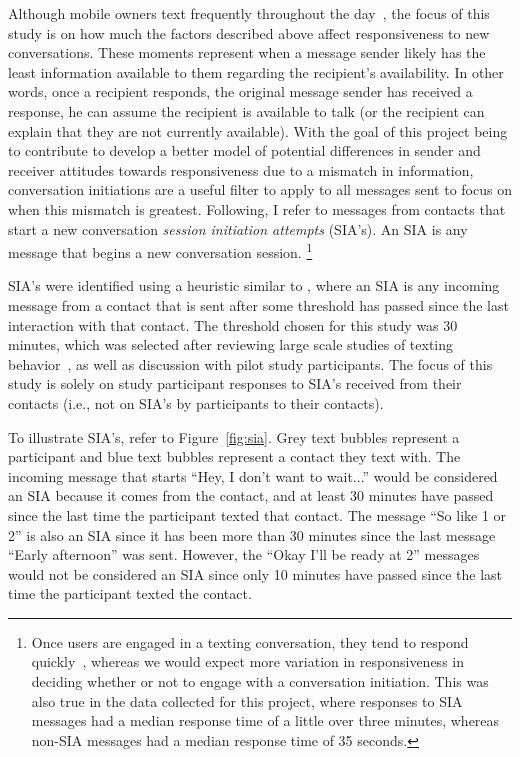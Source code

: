 \documentclass[12pt]{nuthesis}	%
\begin{document}
Although mobile owners text frequently throughout the day~\citep{battestini2010large}, the focus of this study is on how much the factors described above affect responsiveness to new conversations. These moments represent when a message sender likely has the least information available to them regarding the recipient's availability. In other words, once a recipient responds, the original message sender has received a response, he can assume the recipient is available to talk (or the recipient can explain that they are not currently available). With the goal of this project being to contribute to develop a better model of potential differences in sender and receiver attitudes towards responsiveness due to a mismatch in information, conversation initiations are a useful filter to apply to all messages sent to focus on when this mismatch is greatest. Following\citet{avrahami2006responsiveness}, I refer to messages from contacts that start a new conversation \textit{session initiation attempts} (SIA's). An SIA is any message that begins a new conversation session. \footnote{Once users are engaged in a texting conversation, they tend to respond quickly~\citep{battestini2010large}, whereas we would expect more variation in responsiveness in deciding whether or not to engage with a conversation initiation. This was also true in the data collected for this project, where responses to SIA messages had a median response time of a little over three minutes, whereas non-SIA messages had a median response time of 35 seconds.}

SIA's were identified using a heuristic similar to \citet{avrahami2006responsiveness}, where an SIA is any incoming message from a contact that is sent after some threshold has passed since the last interaction with that contact. The threshold chosen for this study was 30 minutes, which was selected after reviewing large scale studies of texting behavior~\citep{battestini2010large,birnholtz2017attending}, as well as discussion with pilot study participants. The focus of this study is solely on study participant responses to SIA's received from their contacts (i.e., not on SIA's by participants to their contacts).

To illustrate SIA's, refer to Figure~\ref{fig:sia}. Grey text bubbles represent a participant and blue text bubbles represent a contact they text with. The incoming message that starts ``Hey, I don't want to wait...'' would be considered an SIA because it comes from the contact, and at least 30 minutes have passed since the last time the participant texted that contact. The message ``So like 1 or 2'' is also an SIA since it has been more than 30 minutes since the last  message ``Early afternoon'' was sent. However, the ``Okay I'll be ready at 2'' messages would not be considered an SIA since only 10 minutes have passed since the last time the participant texted the contact. 
 
\end{document}
